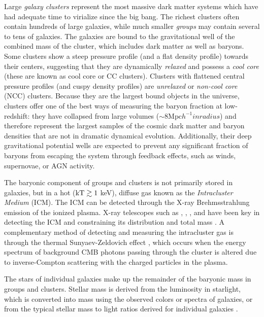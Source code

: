 Large \textit{galaxy clusters} represent the most massive dark matter
systems which have had adequate time to virialize since the big
bang. The richest clusters often contain hundreds of large galaxies,
while much smaller \textit{groups} may contain several to tens of
galaxies. The galaxies are bound to the gravitational well of the
combined mass of the cluster, which includes dark matter as well as
baryons. Some clusters show a steep pressure profile (and a flat
density profile) towards their centers, suggesting that they are
dynamically \textit{relaxed} and possess a \textit{cool core} (these
are known as cool core or CC clusters). Clusters with flattened
central pressure profiles (and cuspy density profiles) are
\textit{unrelaxed} or \textit{non-cool core} (NCC) clusters. Because
they are the largest bound objects in the universe, clusters offer one
of the best ways of measuring the baryon fraction at low-redshift:
they have collapsed from large volumes ($\sim8 \textrm{Mpc} h^{-1} in
radius$) and therefore represent the largest samples of the cosmic
dark matter and baryon densities that are not in dramatic dynamical
evolution. Additionally, their deep gravitational potential wells are
expected to prevent any significant fraction of baryons from escaping
the system through feedback effects, such as winds, supernovae, or AGN
activity.

The baryonic component of groups and clusters is not primarily stored in
galaxies, but in a hot ($\textrm{kT} \gtrsim 1$ keV), diffuse gas known
as the \textit{Intracluster Medium} (ICM). The ICM can be detected
through the X-ray Brehmsstrahlung emission of the ionized
plasma. X-ray telescopes such as \Chandra, \Rosat, \Suzaku, and \XMM{}
have been key in detecting the ICM and constraining its distribution
and total mass . A complementary
method of detecting and measuring the intracluster gas is through the
thermal Sunyaev-Zeldovich effect \citep[SZ,][]{Sunyaev1972}, which
occurs when the energy spectrum of background CMB photons passing
through the cluster is altered due to inverse-Compton scattering with
the charged particles in the plasma.

The stars of individual galaxies make up the remainder of the baryonic
mass in groups and clusters. Stellar mass is derived from the
luminosity in starlight, which is converted into mass using the
observed colors or spectra of galaxies, or from the typical stellar
mass to light ratios derived for individual galaxies
\citep{Bahcall2014}.


